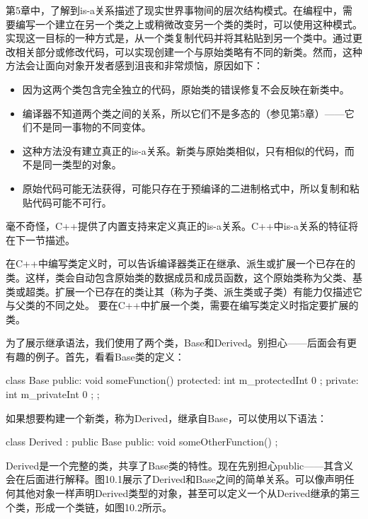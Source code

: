 
第5章中，了解到is-a关系描述了现实世界事物间的层次结构模式。在编程中，需要编写一个建立在另一个类之上或稍微改变另一个类的类时，可以使用这种模式。实现这一目标的一种方式是，从一个类复制代码并将其粘贴到另一个类中。通过更改相关部分或修改代码，可以实现创建一个与原始类略有不同的新类。然而，这种方法会让面向对象开发者感到沮丧和非常烦恼，原因如下：

\begin{itemize}
\item
因为这两个类包含完全独立的代码，原始类的错误修复不会反映在新类中。

\item
编译器不知道两个类之间的关系，所以它们不是多态的（参见第5章）——它们不是同一事物的不同变体。

\item
这种方法没有建立真正的is-a关系。新类与原始类相似，只有相似的代码，而不是同一类型的对象。

\item
原始代码可能无法获得，可能只存在于预编译的二进制格式中，所以复制和粘贴代码可能不可行。
\end{itemize}

毫不奇怪，C++提供了内置支持来定义真正的is-a关系。C++中is-a关系的特征将在下一节描述。


在C++中编写类定义时，可以告诉编译器类正在继承、派生或扩展一个已存在的类。这样，类会自动包含原始类的数据成员和成员函数，这个原始类称为父类、基类或超类。扩展一个已存在的类让其（称为子类、派生类或子类）有能力仅描述它与父类的不同之处。 要在C++中扩展一个类，需要在编写类定义时指定要扩展的类。

为了展示继承语法，我们使用了两个类，Base和Derived。别担心——后面会有更有趣的例子。首先，看看Base类的定义：

\begin{cpp}
class Base
{
    public:
        void someFunction() {}
    protected:
        int m_protectedInt { 0 };
    private:
        int m_privateInt { 0 };
};
\end{cpp}

如果想要构建一个新类，称为Derived，继承自Base，可以使用以下语法：

\begin{cpp}
class Derived : public Base
{
    public:
        void someOtherFunction() {}
};
\end{cpp}

Derived是一个完整的类，共享了Base类的特性。现在先别担心public——其含义会在后面进行解释。图10.1展示了Derived和Base之间的简单关系。可以像声明任何其他对象一样声明Derived类型的对象，甚至可以定义一个从Derived继承的第三个类，形成一个类链，如图10.2所示。

